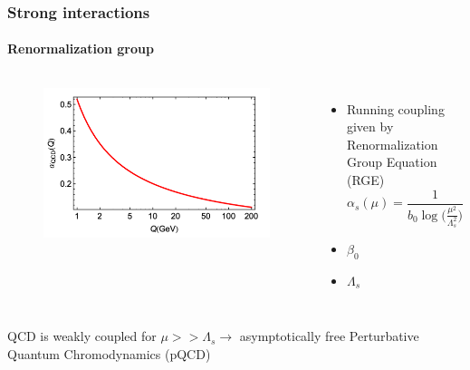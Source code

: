 \documentclass[aspectratio=43]{beamer}
\begin{document}
\begin{frame}

	\frametitle{Strong interactions}
	\framesubtitle{Renormalization group}

	\begin{columns}	
	
		
		\begin{figure}
			\includegraphics[width = 5 cm]{plots/qcd_coupling.png}
		\end{figure}

	
		\begin{itemize}
			\item \footnotesize Running coupling given by Renormalization Group Equation (RGE)
			\begin{equation}
				\alpha_{s}(\mu) = \frac{1}{b_{0} \log\big( \frac{\mu^{2}}{\Lambda_{s}^{2}}\big)} \nonumber
			\end{equation}
			\item \footnotesize $\beta_{0}$
			\item \footnotesize $\Lambda_{s}$
		\end{itemize}

	\end{columns}
	
	\vspace{1cm}
	\center QCD is weakly coupled for $\mu >> \Lambda_{s} \longrightarrow$ asymptotically free
	\center \color{red} Perturbative Quantum Chromodynamics (pQCD)

\end{frame}
\end{document}
